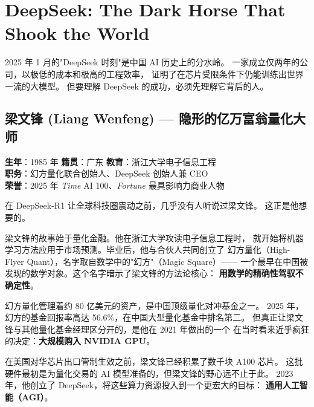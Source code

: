 
\section{DeepSeek: The Dark Horse That Shook the World}
\label{sec:deepseek}

2025 年 1 月的"DeepSeek 时刻"是中国 AI 历史上的分水岭。
一家成立仅两年的公司，以极低的成本和极高的工程效率，
证明了在芯片受限条件下仍能训练出世界一流的大模型。
但要理解 DeepSeek 的成功，必须先理解它背后的人。

\subsection{梁文锋 (Liang Wenfeng) — 隐形的亿万富翁量化大师}

\begin{keybox}
\textbf{生年}：1985 年 \quad \textbf{籍贯}：广东 \quad \textbf{教育}：浙江大学电子信息工程 \\
\textbf{职务}：幻方量化联合创始人、DeepSeek 创始人兼 CEO \\
\textbf{荣誉}：2025 年 \textit{Time} AI 100、\textit{Fortune} 最具影响力商业人物
\end{keybox}

在 DeepSeek-R1 让全球科技圈震动之前，几乎没有人听说过梁文锋。
这正是他想要的。

梁文锋的故事始于量化金融。他在浙江大学攻读电子信息工程时，
就开始将机器学习方法应用于市场预测。毕业后，他与合伙人共同创立了
幻方量化（High-Flyer Quant），名字取自数学中的"幻方"（Magic Square）——
一个最早在中国被发现的数学对象。这个名字暗示了梁文锋的方法论核心：
\textbf{用数学的精确性驾驭不确定性}。

幻方量化管理着约 80 亿美元的资产，是中国顶级量化对冲基金之一。
2025 年，幻方的基金回报率高达 56.6\%，在中国大型量化基金中排名第二。
但真正让梁文锋与其他量化基金经理区分开的，是他在 2021 年做出的一个
在当时看来近乎疯狂的决定：\textbf{大规模购入 NVIDIA GPU}。

在美国对华芯片出口管制生效之前，梁文锋已经积累了数千块 A100 芯片。
这批硬件最初是为量化交易的 AI 模型准备的，但梁文锋的野心远不止于此。
2023 年，他创立了 DeepSeek，将这些算力资源投入到一个更宏大的目标：
\textbf{通用人工智能（AGI）}。

